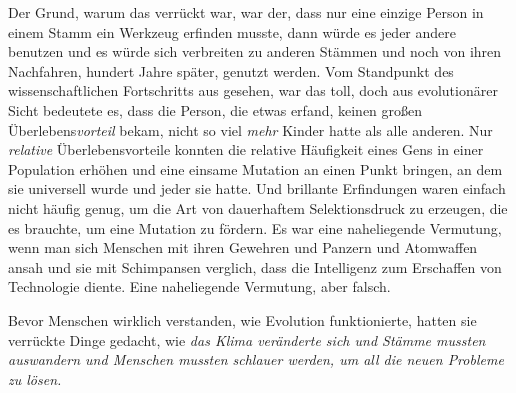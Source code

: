 Der Grund, warum das verrückt war, war der, dass nur eine einzige Person in einem Stamm ein Werkzeug erfinden musste, dann würde es jeder andere benutzen und es würde sich verbreiten zu anderen Stämmen und noch von ihren Nachfahren, hundert Jahre später, genutzt werden. Vom Standpunkt des wissenschaftlichen Fortschritts aus gesehen, war das toll, doch aus evolutionärer Sicht bedeutete es, dass die Person, die etwas erfand, keinen großen Überlebens\emph{vorteil} bekam, nicht so viel \emph{mehr} Kinder hatte als alle anderen. Nur \emph{relative} Überlebensvorteile konnten die relative Häufigkeit eines Gens in einer Population erhöhen und eine einsame Mutation an einen Punkt bringen, an dem sie universell wurde und jeder sie hatte. Und brillante Erfindungen waren einfach nicht häufig genug, um die Art von dauerhaftem Selektionsdruck zu erzeugen, die es brauchte, um eine Mutation zu fördern. Es war eine naheliegende Vermutung, wenn man sich Menschen mit ihren Gewehren und Panzern und Atomwaffen ansah und sie mit Schimpansen verglich, dass die Intelligenz zum Erschaffen von Technologie diente. Eine naheliegende Vermutung, aber falsch.

Bevor Menschen wirklich verstanden, wie Evolution funktionierte, hatten sie verrückte Dinge gedacht, wie \emph{das Klima veränderte sich und Stämme mussten auswandern und Menschen mussten schlauer werden, um all die neuen Probleme zu lösen.}

